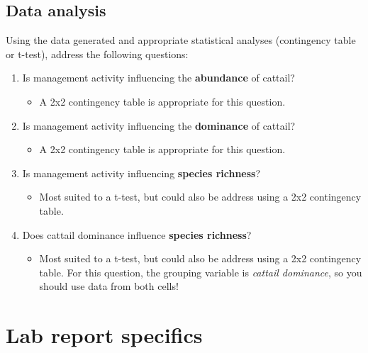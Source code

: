 \documentclass[11pt,]{article}
\providecommand{\tightlist}{%
\setlength{\itemsep}{0pt}\setlength{\parskip}{0pt}}
\begin{document}
\hypertarget{data-analysis}{%
\subsection{Data analysis}\label{data-analysis}}

Using the data generated and appropriate statistical analyses
(contingency table or t-test), address the following questions:

\begin{enumerate}
\def\labelenumi{\arabic{enumi}.}
\tightlist
\item
  Is management activity influencing the \textbf{abundance} of cattail?

  \begin{itemize}
  \tightlist
  \item
    A 2x2 contingency table is appropriate for this question.
  \end{itemize}
\item
  Is management activity influencing the \textbf{dominance} of cattail?

  \begin{itemize}
  \tightlist
  \item
    A 2x2 contingency table is appropriate for this question.
  \end{itemize}
\item
  Is management activity influencing \textbf{species richness}?

  \begin{itemize}
  \tightlist
  \item
    Most suited to a t-test, but could also be address using a 2x2
    contingency table.
  \end{itemize}
\item
  Does cattail dominance influence \textbf{species richness}?

  \begin{itemize}
  \tightlist
  \item
    Most suited to a t-test, but could also be address using a 2x2
    contingency table. For this question, the grouping variable is
    \emph{cattail dominance}, so you should use data from both cells!
  \end{itemize}
\end{enumerate}

\pagebreak

\hypertarget{lab-report-specifics}{%
\section{Lab report specifics}\label{lab-report-specifics}}
\end{document}
